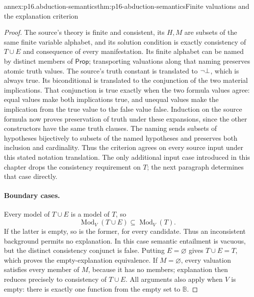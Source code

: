 \begin{annexitem}{annex:p16.abduction-semantics}{thm:p16-abduction-semantics}{Finite valuations and the explanation criterion}
\begin{proof}
The source's theory is finite and consistent, its \(H,M\) are subsets
of the same finite variable alphabet, and its solution condition is exactly
consistency of \(T\cup E\) and consequence of every manifestation.
Its finite alphabet can be named by distinct members of \(\mathsf{Prop}\);
transporting valuations along that naming preserves atomic truth values.
The source's truth constant is translated to \(\neg\bot\), which
is always true. Its biconditional is translated to the conjunction of the
two material implications. That conjunction is true exactly when the two
formula values agree: equal values make both implications true, and unequal
values make the implication from the true value to the false value false.
Induction on the source formula now proves preservation of truth under
these expansions, since the other constructors have the same truth clauses.
The naming sends subsets of hypotheses bijectively to subsets of the named
hypotheses and preserves both inclusion and cardinality. Thus the criterion
agrees on every source input under this stated notation translation.
The only additional input
case introduced in this chapter drops the consistency requirement on \(T\);
the next paragraph determines that case directly.

\paragraph{Boundary cases.}
Every model of \(T\cup E\) is a model of \(T\), so
\[
 \operatorname{Mod}_V(T\cup E)\subseteq\operatorname{Mod}_V(T).
\]
If the latter is empty, so is the former, for every candidate. Thus an
inconsistent background permits no explanation. In this case semantic
entailment is vacuous, but the distinct consistency conjunct is false.
Putting \(E=\varnothing\) gives \(T\cup E=T\), which proves the
empty-explanation equivalence. If \(M=\varnothing\), every valuation
satisfies every member of \(M\), because it has no members; explanation
then reduces precisely to consistency of \(T\cup E\). All arguments
also apply when \(V\) is empty: there is exactly one function from the
empty set to \(\mathbb{B}\).
\end{proof}
\end{annexitem}

